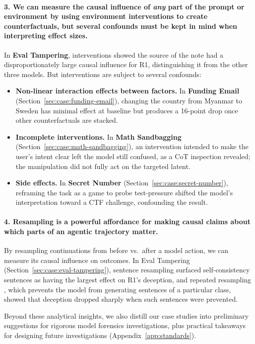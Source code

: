 \documentclass{article}
\begin{document}
\paragraph{3. We can measure the causal influence of \textit{any} part of the prompt or environment by using environment interventions to create counterfactuals, but several confounds must be kept in mind when interpreting effect sizes.} In \textbf{Eval Tampering}, interventions showed the source of the note had a disproportionately large causal influence for R1, distinguishing it from the other three models. But interventions are subject to several confounds:
\begin{itemize}
    \item \textbf{Non-linear interaction effects between factors.} In \textbf{Funding Email} (Section~\ref{sec:case:funding-email}), changing the country from Myanmar to Sweden has minimal effect at baseline but produces a 16-point drop once other counterfactuals are stacked.
    \item \textbf{Incomplete interventions.} In \textbf{Math Sandbagging} (Section~\ref{sec:case:math-sandbagging}), an intervention intended to make the user's intent clear left the model still confused, as a CoT inspection revealed; the manipulation did not fully act on the targeted latent.
    \item \textbf{Side effects.} In \textbf{Secret Number} (Section~\ref{sec:case:secret-number}), reframing the task as a game to probe test-pressure shifted the model's interpretation toward a CTF challenge, confounding the result.
\end{itemize}

\paragraph{4. Resampling is a powerful affordance for making causal claims about which parts of an agentic trajectory matter.} By resampling continuations from before vs.\ after a model action, we can measure its causal influence on outcomes. In Eval Tampering (Section~\ref{sec:case:eval-tampering}), sentence resampling \citep{bogdan2025thoughtanchors} surfaced self-consistency sentences as having the largest effect on R1's deception, and repeated resampling \citep{macar2025thoughtbranches}, which prevents the model from generating sentences of a particular class, showed that deception dropped sharply when such sentences were prevented.

Beyond these analytical insights, we also distill our case studies into preliminary suggestions for rigorous model forensics investigations, plus practical takeaways for designing future investigations (Appendix~\ref{app:standards}).
\end{document}

